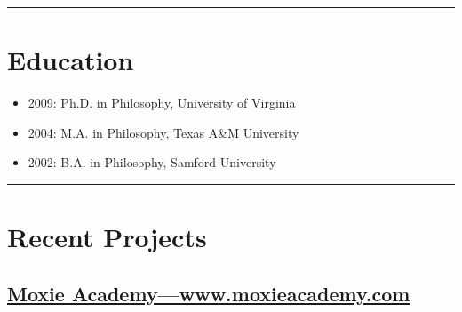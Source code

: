 \documentclass{article}
\begin{document}
\hrule
\section{Education} %
\label{sec:Education}

\begin{itemize}
  \item 2009: Ph.D. in Philosophy, University of Virginia
  \item 2004: M.A. in Philosophy, Texas A\&M University
  \item 2002: B.A. in Philosophy, Samford University
\end{itemize}
\newpage
\hrule
\section{Recent Projects} %
\label{sec:Recent Projects}


\subsection{\href{http://www.moxieacademy.com}{Moxie Academy---www.moxieacademy.com}}
\label{sub:Moxie Academy}
\end{document}
